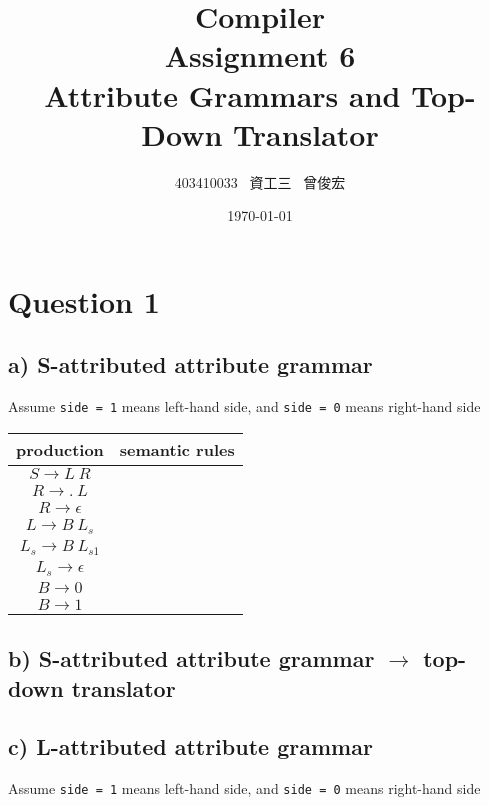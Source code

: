 \documentclass[12pt, A4]{article}
\title{Compiler \\ Assignment 6 \\ Attribute Grammars and Top-Down Translator}
\author{403410033 \ 資工三 \ 曾俊宏}
\date{\today}
\begin{document}
	
	\maketitle
	\newpage

	\section{Question 1}
	
	\subsection*{a) S-attributed attribute grammar}
    
    Assume \texttt{side = 1} means left-hand side, and \texttt{side = 0} means right-hand side\\
    
    \begin{tabular}{|c|c|}
        \hline 
        production & semantic rules\\
        \hline 
        $S \rightarrow L\ R$& \\ 
        \hline 
        $R \rightarrow .\ L$&  \\ 
        \hline 
        $R \rightarrow \epsilon$&  \\ 
        \hline 
        $L \rightarrow B\ L_s$&  \\ 
        \hline 
        $L_s \rightarrow B\ L_{s1}$&  \\ 
        \hline 
        $L_s \rightarrow \epsilon$&  \\ 
        \hline 
        $B \rightarrow 0$&  \\ 
        \hline 
        $B \rightarrow 1$&  \\ 
        \hline 
    \end{tabular} 
	
    \newpage
	\subsection*{b) S-attributed attribute grammar $\rightarrow$ top-down translator}
	
    \newpage
	\subsection*{c) L-attributed attribute grammar}
    
    Assume \texttt{side = 1} means left-hand side, and \texttt{side = 0} means right-hand side\\
    
\end{document}
